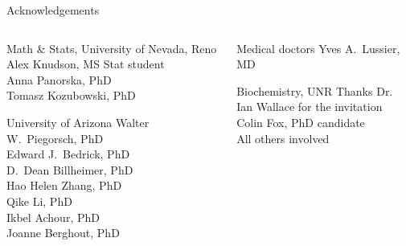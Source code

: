 \documentclass[ignorenonframetext,aspectratio=169,]{beamer}
\begin{document}
\begin{frame}{%
\protect\hypertarget{acknowledgements}{%
Acknowledgements}}

\begin{columns}[T]
  \begin{column}{0.55\columnwidth}
    \begin{block}{Math \& Stats, University of Nevada, Reno}
      Alex Knudson, MS Stat student\\
      Anna Panorska, PhD\\
      Tomasz Kozubowski, PhD
    \end{block}
    \begin{block}{University of Arizona}
      Walter W.~Piegorsch, PhD\\
      Edward J.~Bedrick, PhD\\
      D.~Dean Billheimer, PhD\\
      Hao Helen Zhang, PhD\\
      Qike Li, PhD\\
      Ikbel Achour, PhD\\
      Joanne Berghout, PhD
    \end{block}
  \end{column}

\begin{column}{0.45\columnwidth}
    \begin{block}{Medical doctors}
      Yves A.~Lussier, MD
    \end{block}
    \begin{block}{Biochemistry, UNR}
      Thanks Dr. Ian Wallace for the invitation\\
      Colin Fox, PhD candidate\\
      All others involved
    \end{block}
  \end{column}
\end{columns}

\end{frame}
\end{document}
